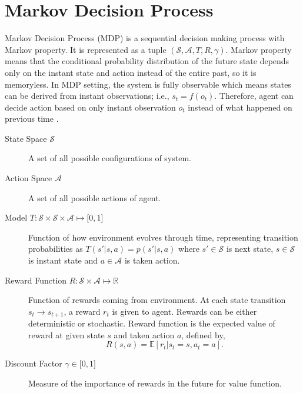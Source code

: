 \section{Markov Decision Process}
\label{sec:mdp}

Markov Decision Process (MDP) is a sequential decision making process with Markov property. 
It is represented as a tuple $(\mathcal{S},\mathcal{A},T,R,\gamma)$. 
Markov property means that the conditional probability distribution of the future state depends only on the instant state and action instead of the entire past, so it is memoryless. 
In MDP setting, the system is fully observable which means states can be derived from instant observations; i.e., $s_t=f(o_t)$. 
Therefore, agent can decide action based on only instant observation $o_t$ instead of what happened on previous time \cite{francois-lavet_introduction_2018}. 

\begin{description}
	\item[State Space $\mathcal{S}$] A set of all possible configurations of system. 
	
	\item[Action Space $\mathcal{A}$]  A set of all possible actions of agent. 
	
	\item[Model $T \colon \mathcal{S} \times \mathcal{S} \times \mathcal{A} \mapsto \lbrack 0,1 \rbrack$] Function of how environment evolves through time, representing transition probabilities as $T(s'|s,a) = p(s'|s,a)$ 
	where $s' \in \mathcal{S}$ is next state, $s \in \mathcal{S}$ is instant state and $a \in \mathcal{A}$ is taken action.
	
	\item[Reward Function $R \colon \mathcal{S} \times \mathcal{A} \mapsto \mathbb{R}$] Function of rewards coming from environment. 
	At each state transition $s_t \rightarrow s_{t+1}$, a reward $r_t$ is given to agent. 
	Rewards can be either deterministic or stochastic. 
	Reward function is the expected value of reward at given state $s$ and taken action $a$, defined by,
	\begin{equation}
	R(s,a) = \mathbb{E}[r_t|s_t=s, a_t=a]. %
	\end{equation}
	
	\item[Discount Factor $\gamma \in \lbrack 0,1 \rbrack$] Measure of the importance of rewards in the future for value function.
\end{description}
